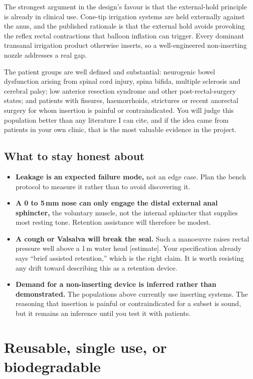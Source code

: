\documentclass[11pt]{article}
\newcommand{\est}{\mbox{\textcolor{warn}{\footnotesize[estimate]}}}
\begin{document}
The strongest argument in the design's favour is that the external-hold principle is already in clinical use. Cone-tip irrigation systems are held externally against the anus, and the published rationale is that the external hold avoids provoking the reflex rectal contractions that balloon inflation can trigger. Every dominant transanal irrigation product otherwise inserts, so a well-engineered non-inserting nozzle addresses a real gap.

The patient groups are well defined and substantial: neurogenic bowel dysfunction arising from spinal cord injury, spina bifida, multiple sclerosis and cerebral palsy; low anterior resection syndrome and other post-rectal-surgery states; and patients with fissures, haemorrhoids, strictures or recent anorectal surgery for whom insertion is painful or contraindicated. You will judge this population better than any literature I can cite, and if the idea came from patients in your own clinic, that is the most valuable evidence in the project.

\subsection*{What to stay honest about}

\begin{itemize}
  \item \textbf{Leakage is an expected failure mode,} not an edge case. Plan the bench protocol to measure it rather than to avoid discovering it.
  \item \textbf{A 0 to 5\,mm nose can only engage the distal external anal sphincter,} the voluntary muscle, not the internal sphincter that supplies most resting tone. Retention assistance will therefore be modest.
  \item \textbf{A cough or Valsalva will break the seal.} Such a manoeuvre raises rectal pressure well above a 1\,m water head \est. Your specification already says ``brief assisted retention,'' which is the right claim. It is worth resisting any drift toward describing this as a retention device.
  \item \textbf{Demand for a non-inserting device is inferred rather than demonstrated.} The populations above currently use inserting systems. The reasoning that insertion is painful or contraindicated for a subset is sound, but it remains an inference until you test it with patients.
\end{itemize}

\section{Reusable, single use, or biodegradable}
\end{document}

